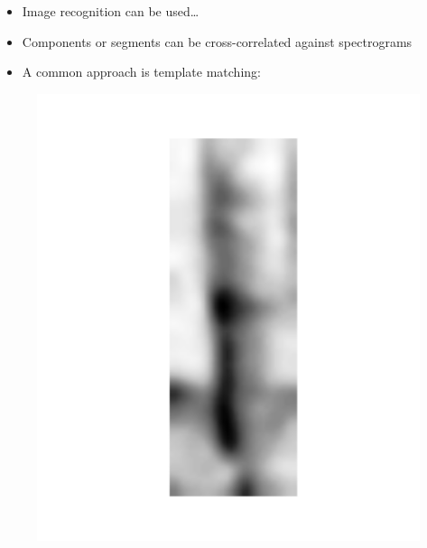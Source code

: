 \documentclass[t, xcolor={dvipsnames}]{beamer}
\begin{document}
\begin{frame}[fragile]
  \vspace{0.5cm}
  \begin{addmargin}{0.5cm}
    \begin{itemize}
      \item Image recognition can be used\ldots
      \item Components or segments can be cross-correlated against spectrograms
      \item A common approach is template matching:
    \end{itemize}

  \end{addmargin}
    \begin{figure}[!tbp]
      \centering
      \begin{minipage}[c]{0.3\textwidth}
        \includegraphics[width=\textwidth]{img/selected-feature}
      \end{minipage}
      \hfill
      \begin{minipage}[c]{0.3\textwidth}

\end{minipage}
\end{figure}
\end{frame}
\end{document}
